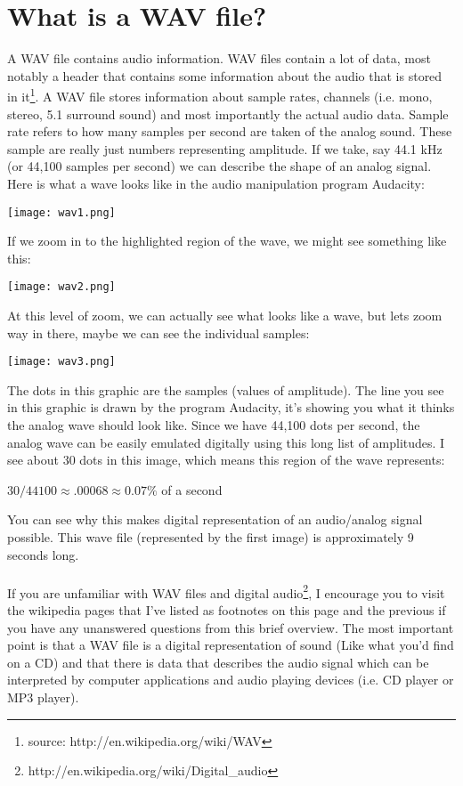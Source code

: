 \documentclass[12pt]{article}
\begin{document}
\section{What is a WAV file?}
A WAV file contains audio information. WAV files contain a lot of data, most notably a header that contains some information about the audio that is stored in it\footnote{source: http://en.wikipedia.org/wiki/WAV}. A WAV file stores information about sample rates, channels (i.e. mono, stereo, 5.1 surround sound) and most importantly the actual audio data. Sample rate refers to how many samples per second are taken of the analog sound. These sample are really just numbers representing amplitude. If we take, say 44.1 kHz (or 44,100 samples per second) we can describe the shape of an analog signal. Here is what a wave looks like in the audio manipulation program Audacity:
\begin{center}
\texttt{[image: wav1.png]}
\end{center}
If we zoom in to the highlighted region of the wave, we might see something like this:
\begin{center}
\texttt{[image: wav2.png]}
\end{center}
At this level of zoom, we can actually see what looks like a wave, but lets zoom way in there, maybe we can see the individual samples:
\begin{center}
\texttt{[image: wav3.png]}
\end{center}
The dots in this graphic are the samples (values of amplitude). The line you see in this graphic is drawn by the program Audacity, it's showing you what it thinks the analog wave should look like. Since we have 44,100 dots per second, the analog wave can be easily emulated digitally using this long list of amplitudes. I see about 30 dots in this image, which means this region of the wave represents:\\
\begin{center}
\begin{math}
30/44100 \approx .00068 \approx 0.07\%\end{math} of a second
\end{center}
You can see why this makes digital representation of an audio/analog signal possible. This wave file (represented by the first image) is approximately 9 seconds long.
\\ \\
If you are unfamiliar with WAV files and digital audio\footnote{http://en.wikipedia.org/wiki/Digital\_audio}, I encourage you to visit the wikipedia pages that I've listed as footnotes on this page and the previous if you have any unanswered questions from this brief overview. The most important point is that a WAV file is a digital representation of sound (Like what you'd find on a CD) and that there is data that describes the audio signal which can be interpreted by computer applications and audio playing devices (i.e. CD player or MP3 player).
\end{document}
